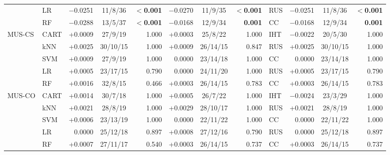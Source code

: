 \begin{table}[!htbp]
\begin{adjustbox}{max width=\linewidth}
\begin{tabular}{llrcrrcrlrcr}
 & LR & $-$0.0251 & 11/8/36 & \textbf{$<$0.001} & $-$0.0270 & 11/9/35 & \textbf{$<$0.001} & RUS & $-$0.0251 & 11/8/36 & \textbf{$<$0.001} \\
 & RF & $-$0.0288 & 13/5/37 & \textbf{$<$0.001} & $-$0.0168 & 12/9/34 & \textbf{0.001} & CC & $-$0.0168 & 12/9/34 & \textbf{0.001} \\
\midrule
MUS-CS & CART & +0.0009 & 27/9/19 & 1.000 & +0.0003 & 25/8/22 & 1.000 & IHT & $-$0.0022 & 20/5/30 & 1.000 \\
 & kNN & +0.0025 & 30/10/15 & 1.000 & +0.0009 & 26/14/15 & 0.847 & RUS & +0.0025 & 30/10/15 & 1.000 \\
 & SVM & +0.0009 & 27/9/19 & 1.000 & 0.0000 & 23/14/18 & 1.000 & CC & 0.0000 & 23/14/18 & 1.000 \\
 & LR & +0.0005 & 23/17/15 & 0.790 & 0.0000 & 24/11/20 & 1.000 & RUS & +0.0005 & 23/17/15 & 0.790 \\
 & RF & +0.0016 & 32/8/15 & 0.466 & +0.0003 & 26/14/15 & 0.783 & CC & +0.0003 & 26/14/15 & 0.783 \\
\midrule
MUS-CO & CART & +0.0014 & 30/7/18 & 1.000 & +0.0005 & 26/7/22 & 1.000 & IHT & $-$0.0024 & 23/3/29 & 1.000 \\
 & kNN & +0.0021 & 28/8/19 & 1.000 & +0.0029 & 28/10/17 & 1.000 & RUS & +0.0021 & 28/8/19 & 1.000 \\
 & SVM & +0.0006 & 23/13/19 & 1.000 & 0.0000 & 22/11/22 & 1.000 & CC & 0.0000 & 22/11/22 & 1.000 \\
 & LR & 0.0000 & 25/12/18 & 0.897 & +0.0008 & 27/12/16 & 0.790 & RUS & 0.0000 & 25/12/18 & 0.897 \\
 & RF & +0.0007 & 27/11/17 & 0.540 & +0.0003 & 26/14/15 & 0.737 & CC & +0.0003 & 26/14/15 & 0.737 \\
\bottomrule
\end{tabular}
\end{adjustbox}
\end{table}
